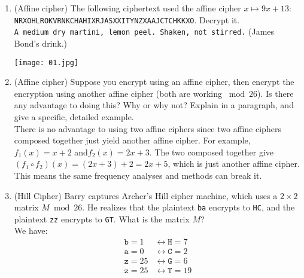 \documentclass[12pt]{amsart}
\theoremstyle{plain}
\theoremstyle{definition}
\begin{document}
\begin{enumerate}[1.]
	\item (Affine cipher) The following ciphertext used the affine cipher $x \mapsto 9x+13$:\\ \texttt{NRXOHLROKVRNKCHAHIXRJASXXITYNZXAAJCTCHKKXO}. Decrypt it.\\
	
	\texttt{A medium dry martini, lemon peel.  Shaken, not stirred.} (James Bond's drink.)\\
	\begin{framed}
	\texttt{[image: 01.jpg]}
	\end{framed}
	
	\item (Affine cipher) Suppose you encrypt using an affine cipher, then encrypt the encryption using another affine cipher (both are working $\bmod 26$).  Is there any advantage to doing this?  Why or why not?  Explain in a paragraph, and give a specific, detailed example.\\
	
		There is no advantage to using two affine ciphers since two affine ciphers composed together just yield another affine cipher.   For example, $f_1(x) = x+2$ and$ f_2(x) = 2x+3$.  The two composed together give $(f_1 \circ f_2)(x) = (2x+3)+2 = 2x+5$, which is just another affine cipher.  This means the same frequency analyses and methods can break it.	\\
	
	\item (Hill Cipher)  Barry captures Archer's Hill cipher machine, which uses a $2 \times 2$ matrix $M \bmod 26$.  He realizes that the plaintext \texttt{ba} encrypts to \texttt{HC}, and the plaintext \texttt{zz} encrypts to \texttt{GT}.  What is the matrix $M$?\\
		
	We have:
	\begin{align*}
	\texttt{b} =1 &\leftrightarrow \texttt{H}=7\\
	\texttt{a} =0  &\leftrightarrow \texttt{C}=2\\
	\texttt{z} =25  &\leftrightarrow \texttt{G}=6\\
	\texttt{z} =25  &\leftrightarrow \texttt{T}=19\\
	\end{align*}	
	

\end{enumerate}
\end{document}
